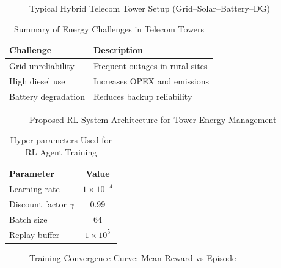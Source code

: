 
\begin{figure}[htbp]
  \centering
  \fbox{\rule{0pt}{3in}\rule{0.9\linewidth}{0pt}}
  \caption{Typical Hybrid Telecom Tower Setup (Grid–Solar–Battery–DG)}
  \label{fig:tower-setup}
\end{figure}

\begin{table}[htbp]
  \centering
  \caption{Summary of Energy Challenges in Telecom Towers}
  \begin{tabular}{l l}
  \toprule
  Challenge & Description \\
  \midrule
  Grid unreliability & Frequent outages in rural sites \\
  High diesel use & Increases OPEX and emissions \\
  Battery degradation & Reduces backup reliability \\
  \bottomrule
  \end{tabular}
  \label{tab:tower-challenges}
\end{table}

\begin{figure}[htbp]
  \centering
  \fbox{\rule{0pt}{3in}\rule{0.9\linewidth}{0pt}}
  \caption{Proposed RL System Architecture for Tower Energy Management}
  \label{fig:system-architecture}
\end{figure}

\begin{table}[htbp]
  \centering
  \caption{Hyper-parameters Used for RL Agent Training}
  \begin{tabular}{l c}
  \toprule
  Parameter & Value \\
  \midrule
  Learning rate & $1\times10^{-4}$ \\
  Discount factor $\gamma$ & 0.99 \\
  Batch size & 64 \\
  Replay buffer & $1\times10^{5}$ \\
  \bottomrule
  \end{tabular}
  \label{tab:hyperparameters}
\end{table}

\begin{figure}[htbp]
  \centering
  \fbox{\rule{0pt}{3in}\rule{0.9\linewidth}{0pt}}
  \caption{Training Convergence Curve: Mean Reward vs Episode}
  \label{fig:reward-curve}
\end{figure}

